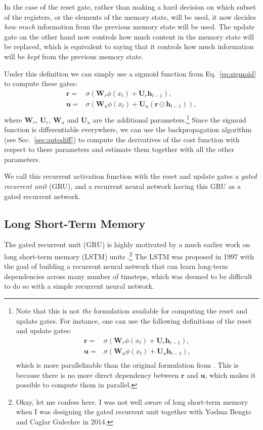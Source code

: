 \documentclass{report}
\newcommand{\vect}[1]{\mathbf{#1}}
\newcommand{\matr}[1]{\mathbf{#1}}
\newcommand{\vh}[0]{\vect{h}}
\newcommand{\vu}[0]{\vect{u}}
\newcommand{\vr}[0]{\vect{r}}
\newcommand{\mW}[0]{\matr{W}}
\newcommand{\mU}[0]{\matr{U}}
\newcommand{\sigmoid}{\sigma}
\begin{document}
In the case of the reset gate, rather than making a hard decision on which
subset of the registers, or the elements of the memory state, will be used, it
now decides {\em how much} information from the previous memory state will be
used. The update gate on the other hand now controls how much content in the
memory state will be replaced, which is equivalent to saying that it controls
how much information will be {\em kept} from the previous memory state.

Under this definition we can simply use a sigmoid function from
Eq.~\eqref{eq:sigmoid} to compute these gates:
\begin{align*}
    \vr =& \sigmoid(\mW_r \phi(x_t) + \mU_r \vh_{t-1}), \\
    \vu =& \sigmoid(\mW_u \phi(x_t) + \mU_u (\vr \odot \vh_{t-1})), \\
\end{align*}
where $\mW_r$, $\mU_r$, $\mW_u$ and $\mU_u$ are the additional
parameters.\footnote{
    Note that this is not {\em the} formulation available for computing the
    reset and update gates. For instance, one can use the following definitions
    of the reset and update gates:
    \begin{align*}
        \vr =& \sigmoid(\mW_r \phi(x_t) + \mU_r \vh_{t-1}), \\
        \vu =& \sigmoid(\mW_u \phi(x_t) + \mU_u \vh_{t-1}), \\
    \end{align*}
    which is more parallelizable than the original formulation from
    \cite{Cho-et-al-EMNLP2014}. This is because there is no more direct
    dependency between $\vr$ and $\vu$, which makes it possible to compute them
    in parallel.
}
Since
the sigmoid function is differentiable everywhere, we can use the
backpropagation algorithm (see Sec.~\ref{sec:autodiff}) to compute the
derivatives of the cost function with respect to these parameters and estimate
them together with all the other parameters.

We call this recurrent activation function with the reset and update gates a
{\em gated recurrent unit} (GRU), and a recurrent neural network having this GRU
as a gated recurrent network.

\subsection{Long Short-Term Memory}
\label{sec:lstm}

The gated recurrent unit (GRU) is highly motivated by a much earlier work on
long short-term memory (LSTM) units \cite{hochreiter1997long}.\footnote{
    Okay, let me confess here. I was not well aware of long short-term memory
    when I was designing the gated recurrent unit together with Yoshua Bengio
    and Caglar Gulcehre in 2014.
} The LSTM was proposed in 1997 with the goal of building a recurrent neural
network that can learn long-term dependencies across many number of timsteps,
which was deemed to be difficult to do so with a simple recurrent neural
network. 
\end{document}
